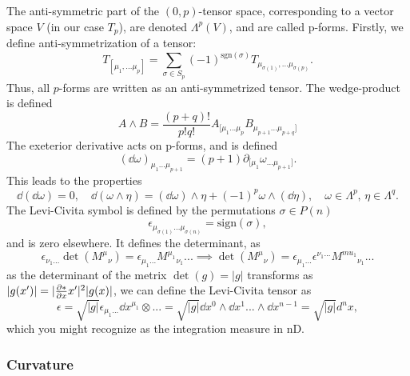 The anti-symmetric part of the $(0, p)$-tensor space, corresponding to a vector 
space $V$ (in our case $T_p$), are denoted $\Lambda^p(V)$, and are called p-forms.
Firstly, we define anti-symmetrization of a tensor:
\begin{equation*}
    T_{[\mu_1, ... \mu_p]} = \sum_{\sigma \in S_p} (-1)^{\mathrm{sgn}(\sigma)} T_{\mu_{\sigma(1)}, ... \mu_{\sigma(p)}}.
\end{equation*}
Thus, all $p$-forms are written as an anti-symmetrized tensor. The wedge-product is defined
\begin{equation*}
    A \wedge B = \frac{(p+q)!}{p!q!} A_{[\mu_1 ... \mu_p} B_{\mu_{p+1} ... \mu_{p+q}]}
\end{equation*}
The exeterior derivative acts on p-forms, and is defined
\begin{equation*}
    (\dd \omega)_{\mu_1 ... \mu_{p+1}}= (p + 1) \partial_{[\mu_1} \omega_{... \mu_{p+1}]}.
\end{equation*}
This leads to the properties
\begin{equation*}
    \dd (\dd \omega) = 0, \quad \dd(\omega \wedge \eta) = (\dd \omega) \wedge \eta + (-1)^p  \omega \wedge(\dd \eta), \quad \omega \in \Lambda^p, \, \eta \in \Lambda^q.
\end{equation*}
The Levi-Civita symbol is defined by the permutations $\sigma \in P(n)$
\begin{equation*}
    \epsilon_{\mu_{\sigma(1)}...\mu_{\sigma(n)}} = \textrm{sign}(\sigma),
\end{equation*}
and is zero elsewhere. It defines the determinant, as
\begin{equation*}
    \epsilon_{\nu_1... } \det(M^{\mu}{}_\nu) = \epsilon_{\mu_1... } M^{\mu_1}{}_{\nu_1}... \implies\det(M^{\mu}{}_\nu) = \epsilon_{\mu_1... } \epsilon^{\nu_1... } M^{mu_1}{}_{\nu_1} ...
\end{equation*}
as the determinant of the metrix $\det(g) = |g|$ transforms as $|g(x')| = |\pdv*{x}{x'}|^2|g(x)|$, we can define the Levi-Civita tensor as
\begin{equation*}
    \epsilon = \sqrt{|g|} \epsilon_{\mu_1...} \dd x^{\mu_1} \otimes ... = \sqrt{|g|} \dd x^0 \wedge \dd x^1 ... \wedge \dd x^{n-1} = \sqrt{|g|} d^nx,
\end{equation*}
which you might recognize as the integration measure in nD.




\subsubsection*{Curvature}


